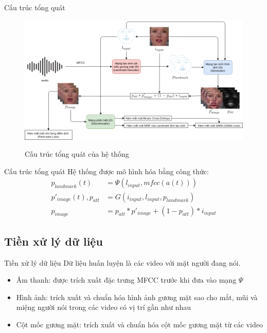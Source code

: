\begin{frame}{Cấu trúc tổng quát}
    \begin{figure}[H]
    \centering
    \includegraphics[width=12cm]{images/common_architecture.png}
    \label{fig:common_architecture}
    \caption{Cấu trúc tổng quát của hệ thống}
    \end{figure}
\end{frame}

\begin{frame}{Cấu trúc tổng quát}
    Hệ thống được mô hình hóa bằng công thức:
    \begin{equation}
        \begin{split}
        p_{landmark}(t) &= \Psi(l_{input}, mfcc(a(t)))\\
        p'_{image}(t), p_{att} &= G(i_{input}, l_{input}, p_{landmark})\\
        p_{image} &= p_{att}*p'_{image}+(1-p_{att})*i_{input}
        \end{split}
    \end{equation}
\end{frame}

\subsection{Tiền xử lý dữ liệu}
\begin{frame}{Tiền xử lý dữ liệu}
    Dữ liệu huấn luyện là các video với mặt người đang nói.
    \begin{itemize}
        \item Âm thanh: được trích xuất đặc trưng MFCC trước khi đưa vào mạng $\Psi$
        \item Hình ảnh: trích xuất và chuẩn hóa hình ảnh gương mặt sao cho mắt, mũi và miệng người nói trong các video có vị trí gần như nhau
        \item Cột mốc gương mặt: trích xuất và chuẩn hóa cột mốc gương mặt từ các video
    \end{itemize}
\end{frame}

